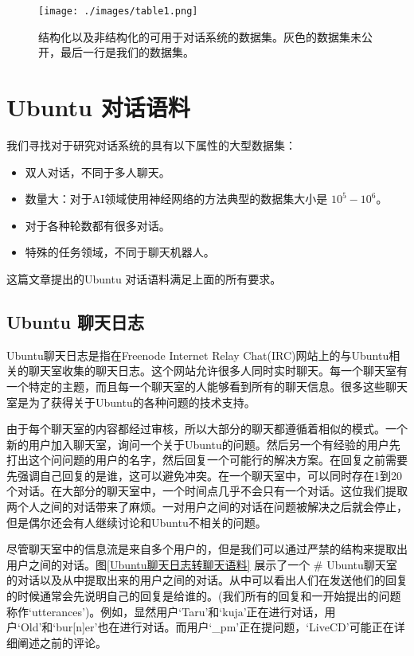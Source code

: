 \documentclass{article}
\begin{document}
\begin{multicols}{2}
		\begin{figure*}[htbp]
			\centering
			\texttt{[image: ./images/table1.png]}
			\caption{结构化以及非结构化的可用于对话系统的数据集。灰色的数据集未公开，最后一行是我们的数据集。}
			\label{其他数据集统计}
		\end{figure*}
		
		
	\section{Ubuntu 对话语料}
	
	我们寻找对于研究对话系统的具有以下属性的大型数据集：
	\begin{itemize}
		\item 双人对话，不同于多人聊天。
		\item 数量大：对于AI领域使用神经网络的方法典型的数据集大小是 $10^5 - 10^6$。
		\item 对于各种轮数都有很多对话。
		\item 特殊的任务领域，不同于聊天机器人。
	\end{itemize}

	这篇文章提出的Ubuntu 对话语料满足上面的所有要求。
	
		\subsection{Ubuntu 聊天日志}
		Ubuntu聊天日志是指在Freenode Internet Relay Chat(IRC)网站上的与Ubuntu相关的聊天室收集的聊天日志。这个网站允许很多人同时实时聊天。每一个聊天室有一个特定的主题，而且每一个聊天室的人能够看到所有的聊天信息。很多这些聊天室是为了获得关于Ubuntu的各种问题的技术支持。
		
		由于每个聊天室的内容都经过审核，所以大部分的聊天都遵循着相似的模式。一个新的用户加入聊天室，询问一个关于Ubuntu的问题。然后另一个有经验的用户先打出这个问问题的用户的名字，然后回复一个可能行的解决方案。在回复之前需要先强调自己回复的是谁，这可以避免冲突。在一个聊天室中，可以同时存在1到20个对话。在大部分的聊天室中，一个时间点几乎不会只有一个对话。这位我们提取两个人之间的对话带来了麻烦。一对用户之间的对话在问题被解决之后就会停止，但是偶尔还会有人继续讨论和Ubuntu不相关的问题。
		
		尽管聊天室中的信息流是来自多个用户的，但是我们可以通过严禁的结构来提取出用户之间的对话。图\ref{Ubuntu聊天日志转聊天语料} 展示了一个 \# Ubuntu聊天室的对话以及从中提取出来的用户之间的对话。从中可以看出人们在发送他们的回复的时候通常会先说明自己的回复是给谁的。(我们所有的回复和一开始提出的问题称作‘utterances’)。例如，显然用户‘Taru’和‘kuja’正在进行对话，用户‘Old’和‘bur[n]er’也在进行对话。而用户‘\_pm’正在提问题，‘LiveCD’可能正在详细阐述之前的评论。
		

\end{multicols}
\end{document}
